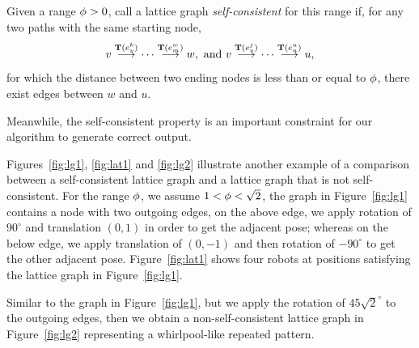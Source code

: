 \begin{defn}
  \label{def:selfconsistent}
  Given a range $\phi > 0$, call a lattice graph \textit{self-consistent} for
  this range if, for any two paths with the same starting node,
  $$ {v}\overset{\mathbf{T}(e_v^{k})}{\longrightarrow}{\cdots}\overset{\mathbf{T}(e_m^{w})}{\longrightarrow}{w}, \mbox{ and } 
    {v}\overset{\mathbf{T}(e_v^{j})}{\longrightarrow}{\cdots}\overset{\mathbf{T}(e_n^{u})}{\longrightarrow}{u}, $$
  for which the distance between two ending nodes is less than or equal to
  $\phi$, there exist edges between $w$ and $u$.
\end{defn}


\begin{figure}
    \centering
    
    \label{fig:self-consistent-graph}
\end{figure}


Meanwhile, the self-consistent property is an important constraint for our algorithm to generate correct output.

\begin{figure}
    \centering
    
\end{figure}

Figures~\ref{fig:lg1}, \ref{fig:lat1} and \ref{fig:lg2} illustrate another example of a comparison between a self-consistent lattice graph and a lattice graph that is not self-consistent. 
%
For the range $\phi$, we assume $1 < \phi < \sqrt{2}$, 
the graph in Figure~\ref{fig:lg1} contains a node with two outgoing edges, on the above edge, we apply rotation of $90^{\circ}$ and translation $(0, 1)$ in order to get the adjacent pose; whereas on the below edge, we apply translation of $(0, -1)$ and then rotation of $-90^{\circ}$ to get the other adjacent pose. 
%
Figure~\ref{fig:lat1} shows four robots at positions satisfying the
lattice graph in Figure~\ref{fig:lg1}. 

Similar to the graph in Figure~\ref{fig:lg1}, but we apply the rotation of $45\sqrt{2}^{\circ}$ to the outgoing edges, 
then we obtain a non-self-consistent lattice graph in Figure~\ref{fig:lg2} representing a whirlpool-like repeated pattern.


